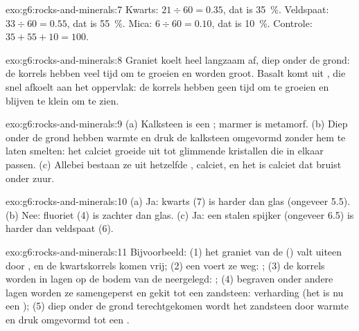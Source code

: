 \begin{solution}{exo:g6:rocks-and-minerals:7}
Kwarts: $21 \div 60 = 0.35$, dat is 35~\%. Veldspaat: $33 \div 60 = 0.55$,
dat is 55~\%. Mica: $6 \div 60 = 0.10$, dat is 10~\%. Controle:
$35 + 55 + 10 = 100$.
\end{solution}

\begin{solution}{exo:g6:rocks-and-minerals:8}
Graniet koelt heel langzaam af, diep onder de grond: de korrels hebben veel
tijd om te groeien en worden groot. Basalt komt uit , die snel afkoelt
aan het oppervlak: de korrels hebben geen tijd om te groeien en blijven te
klein om te zien.
\end{solution}

\begin{solution}{exo:g6:rocks-and-minerals:9}
(a) Kalksteen is een ; marmer is metamorf. (b) Diep
onder de grond hebben warmte en druk de kalksteen omgevormd zonder hem te
laten smelten: het calciet groeide uit tot glimmende kristallen die in
elkaar passen. (c) Allebei bestaan ze uit hetzelfde , calciet, en
het is calciet dat bruist onder zuur.
\end{solution}

\begin{solution}{exo:g6:rocks-and-minerals:10}
(a) Ja: kwarts (7) is harder dan glas (ongeveer 5.5). (b) Nee: fluoriet (4)
is zachter dan glas. (c) Ja: een stalen spijker (ongeveer 6.5) is harder
dan veldspaat (6).
\end{solution}

\begin{solution}{exo:g6:rocks-and-minerals:11}
Bijvoorbeeld: (1) het graniet van de  () valt uiteen
door , en de kwartskorrels komen vrij; (2) een  voert ze
weg: ; (3) de korrels worden in lagen op de bodem van de 
neergelegd: ; (4) begraven onder andere lagen worden ze
samengeperst en gekit tot een zandsteen: verharding (het  is nu
een ); (5) diep onder de grond terechtgekomen wordt het
zandsteen door warmte en druk omgevormd tot een .
\end{solution}

